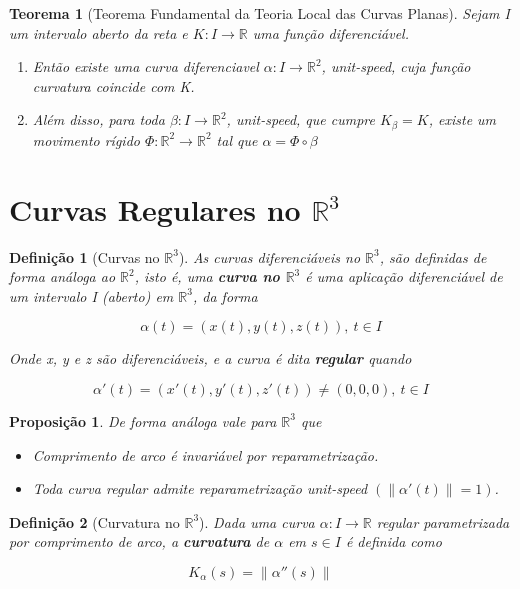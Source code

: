 \documentclass{article}
\newtheorem{prop}{Proposição}
\newtheorem{theorem}{Teorema}
\newtheorem{definition}{Definição}
\begin{document}
\begin{theorem}[Teorema Fundamental da Teoria Local das Curvas Planas]
Sejam I um intervalo aberto da reta e $K: I \rightarrow \mathbb{R}$ uma função diferenciável.

\begin{enumerate}
    \item Então existe uma curva diferenciavel $\alpha: I \rightarrow \mathbb{R}^2$, unit-speed, cuja função curvatura coincide com K.
    
    \item Além disso, para toda $\beta: I \rightarrow \mathbb{R}^2$, unit-speed, que cumpre $K_\beta = K$, existe um movimento rígido $\Phi: \mathbb{R}^2 \rightarrow \mathbb{R}^2$ tal que $\alpha = \Phi \circ \beta$
\end{enumerate}
\end{theorem}

\section*{Curvas Regulares no $\mathbb{R}^3$}
\label{s5}

\begin{definition}[Curvas no $\mathbb{R}^3$]
As curvas diferenciáveis no $\mathbb{R}^3$, são definidas de forma análoga ao $\mathbb{R}^2$, isto é, uma \textbf{curva no $\mathbb{R}^3$} é uma aplicação diferenciável de um intervalo I (aberto) em $\mathbb{R}^3$, da forma

$$\alpha(t) = (x(t), y(t), z(t)),\ t \in I$$

Onde x, y e z são diferenciáveis, e a curva é dita \textbf{regular} quando

$$\alpha'(t) = (x'(t), y'(t), z'(t)) \neq (0, 0, 0),\ t \in I$$
\end{definition}

\begin{prop} De forma análoga vale para $\mathbb{R}^3$ que
\begin{itemize}
    \item Comprimento de arco é invariável por reparametrização.
    
    \item Toda curva regular admite reparametrização \textit{unit-speed} $(\| \alpha'(t) \| = 1)$.
\end{itemize}
\end{prop}

\begin{definition}[Curvatura no $\mathbb{R}^3$]
Dada uma curva $\alpha: I \rightarrow \mathbb{R}$ regular parametrizada por comprimento de arco, a \textbf{curvatura} de $\alpha$ em $s \in I$ é definida como

$$K_\alpha(s) = \| \alpha''(s) \|$$
\end{definition}
\end{document}
